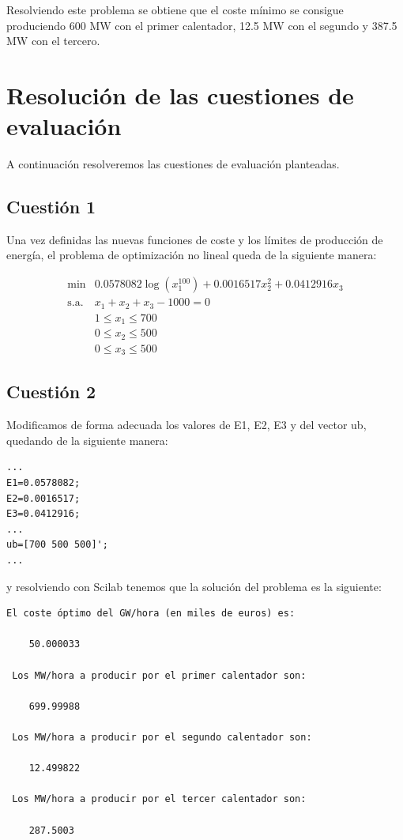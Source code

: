 \documentclass[12pt,a4paper,twoside,openright,titlepage,final]{article}
\begin{document}
Resolviendo este problema se obtiene que el coste mínimo se consigue produciendo 600 MW con el primer calentador, 12.5 MW con el segundo y 387.5 MW con el tercero.

\section{Resolución de las cuestiones de evaluación}

A continuación resolveremos las cuestiones de evaluación planteadas.

\subsection{Cuestión 1}

Una vez definidas las nuevas funciones de coste y los límites de producción de energía, el problema de optimización no lineal queda de la siguiente manera:

\begin{eqnarray*}
\mathrm{min} &  0.0578082\log(x_1^{100}) + 0.0016517x_2^2 + 0.0412916x_3\\
\text{s.a.}  & x_1 + x_2 + x_3 - 1000 = 0 \\
             & 1 \leq x_1 \leq 700 \\ 
             & 0 \leq x_2 \leq 500 \\
             & 0 \leq x_3 \leq 500
\end{eqnarray*}

\subsection{Cuestión 2}

Modificamos de forma adecuada los valores de E1, E2, E3 y del vector ub, quedando de la siguiente manera:

\begin{verbatim}
...
E1=0.0578082;
E2=0.0016517;
E3=0.0412916;
...
ub=[700 500 500]';
...
\end{verbatim}

y resolviendo con Scilab tenemos que la solución del problema es la siguiente:

\begin{verbatim}
El coste óptimo del GW/hora (en miles de euros) es:   
 
    50.000033  
 
 Los MW/hora a producir por el primer calentador son:   
 
    699.99988  
 
 Los MW/hora a producir por el segundo calentador son:   
 
    12.499822  
 
 Los MW/hora a producir por el tercer calentador son:   
 
    287.5003  
\end{verbatim}
\end{document}
